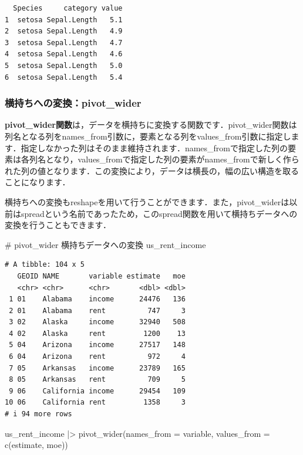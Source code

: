 \documentclass[
  letterpaper,
  DIV=11,
  numbers=noendperiod]{scrreprt}
\newenvironment{Shaded}{\begin{snugshade}}{\end{snugshade}}
\newcommand{\AttributeTok}[1]{\textcolor[rgb]{0.40,0.45,0.13}{#1}}
\newcommand{\CommentTok}[1]{\textcolor[rgb]{0.37,0.37,0.37}{#1}}
\newcommand{\FunctionTok}[1]{\textcolor[rgb]{0.28,0.35,0.67}{#1}}
\newcommand{\NormalTok}[1]{\textcolor[rgb]{0.00,0.23,0.31}{#1}}
\newcommand{\SpecialCharTok}[1]{\textcolor[rgb]{0.37,0.37,0.37}{#1}}
\begin{document}
\begin{verbatim}
  Species     category value
1  setosa Sepal.Length   5.1
2  setosa Sepal.Length   4.9
3  setosa Sepal.Length   4.7
4  setosa Sepal.Length   4.6
5  setosa Sepal.Length   5.0
6  setosa Sepal.Length   5.4
\end{verbatim}

\hypertarget{ux6a2aux6301ux3061ux3078ux306eux5909ux63dbpivot_wider}{%
\subsubsection{横持ちへの変換：pivot\_wider}\label{ux6a2aux6301ux3061ux3078ux306eux5909ux63dbpivot_wider}}

\textbf{pivot\_wider関数}は，データを横持ちに変換する関数です．pivot\_wider関数は列名となる列をnames\_from引数に，要素となる列をvalues\_from引数に指定します．指定しなかった列はそのまま維持されます．names\_fromで指定した列の要素は各列名となり，values\_fromで指定した列の要素がnames\_fromで新しく作られた列の値となります．この変換により，データは横長の，幅の広い構造を取ることになります．

横持ちへの変換もreshapeを用いて行うことができます．また，pivot\_widerは以前はspreadという名前であったため，このspread関数を用いて横持ちデータへの変換を行うこともできます．

\begin{Shaded}
\begin{Highlighting}[]
\CommentTok{\# pivot\_wider 横持ちデータへの変換}
\NormalTok{us\_rent\_income}
\end{Highlighting}
\end{Shaded}

\begin{verbatim}
# A tibble: 104 x 5
   GEOID NAME       variable estimate   moe
   <chr> <chr>      <chr>       <dbl> <dbl>
 1 01    Alabama    income      24476   136
 2 01    Alabama    rent          747     3
 3 02    Alaska     income      32940   508
 4 02    Alaska     rent         1200    13
 5 04    Arizona    income      27517   148
 6 04    Arizona    rent          972     4
 7 05    Arkansas   income      23789   165
 8 05    Arkansas   rent          709     5
 9 06    California income      29454   109
10 06    California rent         1358     3
# i 94 more rows
\end{verbatim}

\begin{Shaded}
\begin{Highlighting}[]
\NormalTok{us\_rent\_income }\SpecialCharTok{|\textgreater{}} \FunctionTok{pivot\_wider}\NormalTok{(}\AttributeTok{names\_from =}\NormalTok{ variable, }\AttributeTok{values\_from =} \FunctionTok{c}\NormalTok{(estimate, moe)) }
\end{Highlighting}
\end{Shaded}
\end{document}
